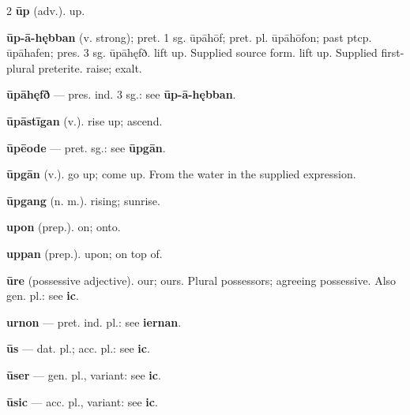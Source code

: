 \begin{multicols*}{2}
\textbf{ūp} (adv.). up.\par
\textbf{ūp-ā-hębban} (v. strong); pret. 1 sg. ūpāhōf; pret. pl. ūpāhōfon; past ptcp. ūpāhafen; pres. 3 sg. ūpāhęfð. lift up. Supplied source form. lift up. Supplied first-plural preterite. raise; exalt.\par
\textbf{ūpāhęfð} — pres. ind. 3 sg.: see \textbf{ūp-ā-hębban}.\par
\textbf{ūpāstīgan} (v.). rise up; ascend.\par
\textbf{ūpēode} — pret. sg.: see \textbf{ūpgān}.\par
\textbf{ūpgān} (v.). go up; come up. From the water in the supplied expression.\par
\textbf{ūpgang} (n. m.). rising; sunrise.\par
\textbf{upon} (prep.). on; onto.\par
\textbf{uppan} (prep.). upon; on top of.\par
\textbf{ūre} (possessive adjective). our; ours. Plural possessors; agreeing possessive. Also gen. pl.: see \textbf{ic}.\par
\textbf{urnon} — pret. ind. pl.: see \textbf{iernan}.\par
\textbf{ūs} — dat. pl.; acc. pl.: see \textbf{ic}.\par
\textbf{ūser} — gen. pl., variant: see \textbf{ic}.\par
\textbf{ūsic} — acc. pl., variant: see \textbf{ic}.\par

\end{multicols*}
